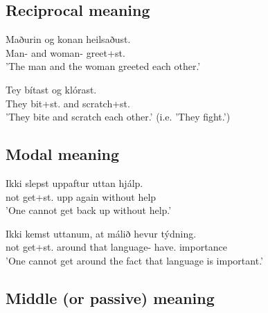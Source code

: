 \documentclass[12pt,%
]{lin-v2/lin}
\begin{document}
\subsection*{Reciprocal meaning}

\begin{exe}
    \ex
    \begin{xlist}
        \item \gll Maðurin og konan heilsaðust.\\
        Man-\Def{} and woman-\Def{} greet+st.\Pst\\
        \trans 'The man and the woman greeted each other.'\\
        \item \gll Tey bítast og klórast.\\
        They bit+st.\Prs{} and scratch+st.\Prs\\
        \trans 'They bite and scratch each other.' (i.e. 'They fight.')
    \end{xlist}
\end{exe}

\subsection*{Modal meaning}

\begin{exe}
    \ex
    \begin{xlist}
        \item \gll Ikki slepst uppaftur uttan hjálp.\\
        not get+st.\Prs{} {upp again} without help\\
        \trans 'One cannot get back up without help.'\\
        \item \gll Ikki kemst uttanum, at málið hevur týdning.\\
        not get+st.\Prs{} around that language-\Def{} have.\Prs{} importance\\
        \trans 'One cannot get around the fact that language is important.'\\
    \end{xlist}
\end{exe}

\subsection*{Middle (or passive) meaning}
\end{document}
